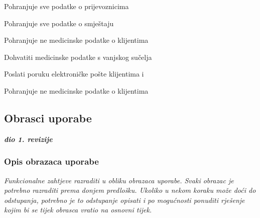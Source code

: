 \begin{packed_enum}
\begin{packed_enum}
					\item Pohranjuje sve podatke o prijevoznicima
					\item Pohranjuje sve podatke o smještaju
					\item Pohranjuje ne medicinske podatke o klijentima
					
				\end{packed_enum}
				
				\item  {}
				
				\begin{packed_enum}
					
					\item Dohvatiti medicinske podatke s vanjskog sučelja
					\item Poslati poruku elektroničke pošte klijentima i 
					\item Pohranjuje ne medicinske podatke o klijentima
					
				\end{packed_enum}
				
					
			\end{packed_enum}
			
			\eject 
			
			
				
			\subsection{Obrasci uporabe}
				
				\textbf{\textit{dio 1. revizije}}
				
				\subsubsection{Opis obrazaca uporabe}
					\textit{Funkcionalne zahtjeve razraditi u obliku obrazaca uporabe. Svaki obrazac je potrebno razraditi prema donjem predlošku. Ukoliko u nekom koraku može doći do odstupanja, potrebno je to odstupanje opisati i po mogućnosti ponuditi rješenje kojim bi se tijek obrasca vratio na osnovni tijek.}\\
					

